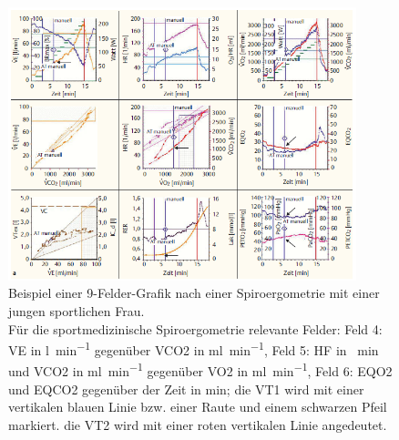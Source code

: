 \begin{figure}[H]
	\centering
	\includegraphics[width=0.9\textwidth]{Bilder/9fieldcomplex.png}
	\caption[Beispielhafte 9-Felder-Grafik nach einer Spiroergometrie]{Beispiel einer 9-Felder-Grafik nach einer Spiroergometrie mit einer jungen sportlichen Frau.\\
	Für die sportmedizinische Spiroergometrie relevante Felder: Feld 4: \gls{VE} in \si{\litre\per\minute} gegenüber \gls{VCO2} in \si{\milli\litre\per\minute}, Feld 5: \gls{HF} in \si{\per\minute} und \gls{VCO2} in \si{\milli\litre\per\minute} gegenüber \gls{VO2} in \si{\milli\litre\per\minute}, Feld 6: \acrshort{EQO2} und \acrshort{EQCO2} gegenüber der Zeit in \si{\minute}; die VT1 wird mit einer vertikalen blauen Linie bzw. einer Raute und einem schwarzen Pfeil markiert. die VT2 wird mit einer roten vertikalen Linie angedeutet.~\cite{Kroidl.2015}}
	\label{pic:pic2}
\end{figure}
%
